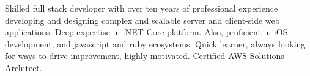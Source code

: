 

\begin{cvparagraph}

Skilled full stack developer with over ten years of professional experience
developing and designing complex and scalable server and client-side web
applications. Deep expertise in .NET Core platform. Also, proficient in iOS
development, and javascript and ruby ecosystems. Quick learner, always looking
for ways to drive improvement, highly motivated. Certified AWS Solutions Architect.
\end{cvparagraph}
